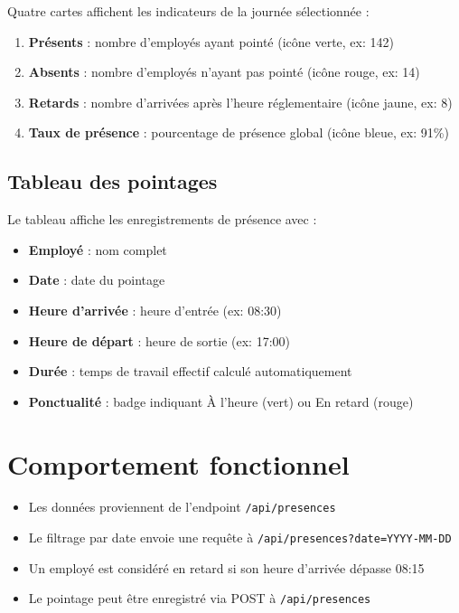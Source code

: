 \documentclass[12pt,a4paper]{report}
\begin{document}
Quatre cartes affichent les indicateurs de la journée sélectionnée :
\begin{enumerate}
    \item \textbf{Présents} : nombre d'employés ayant pointé (icône verte, ex: 142)
    \item \textbf{Absents} : nombre d'employés n'ayant pas pointé (icône rouge, ex: 14)
    \item \textbf{Retards} : nombre d'arrivées après l'heure réglementaire (icône jaune, ex: 8)
    \item \textbf{Taux de présence} : pourcentage de présence global (icône bleue, ex: 91\%)
\end{enumerate}

\subsection{Tableau des pointages}

Le tableau affiche les enregistrements de présence avec :
\begin{itemize}
    \item \textbf{Employé} : nom complet
    \item \textbf{Date} : date du pointage
    \item \textbf{Heure d'arrivée} : heure d'entrée (ex: 08:30)
    \item \textbf{Heure de départ} : heure de sortie (ex: 17:00)
    \item \textbf{Durée} : temps de travail effectif calculé automatiquement
    \item \textbf{Ponctualité} : badge indiquant \og À l'heure \fg{} (vert) ou \og En retard \fg{} (rouge)
\end{itemize}

\section{Comportement fonctionnel}

\begin{itemize}
    \item Les données proviennent de l'endpoint \texttt{/api/presences}
    \item Le filtrage par date envoie une requête à \texttt{/api/presences?date=YYYY-MM-DD}
    \item Un employé est considéré en retard si son heure d'arrivée dépasse 08:15
    \item Le pointage peut être enregistré via POST à \texttt{/api/presences}
\end{itemize}
\end{document}
